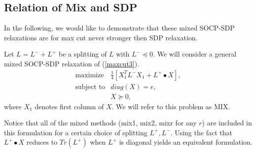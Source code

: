 \documentclass[12pt]{book}
\theoremstyle{definition}
\begin{document}



\subsection{Relation of Mix and SDP}

In the following, we would like to demonstrate that these mixed SOCP-SDP relaxations are for max cut never stronger then SDP relaxation. 

Let $L = L^- + L^+$ be a splitting of $L$ with $L^-\preceq 0.$
We will consider a general mixed SOCP-SDP relaxation of (\ref{maxcut3}).
\begin{equation}
\label{MaxCutMixedRelaxGeneral}
\begin{array}{ll}
\mbox{maximize} & \frac{1}{4}\left[ X_1^TL^-X_1 + L^+\bullet X \right], \\
\mbox{subject to} &  diag(X) = e, \\
			& X\succeq 0,
\end{array}
\end{equation}
where $X_1$ denotes first column of $X$. We will refer to this problem as MIX.

\rem Notice that all of the mixed methods (mix1, mix2, mixr for any $r$) are included in this formulation for a certain choice of splitting $L^+, L^-$. Using the fact that $L^+\bullet X$ reduces to $Tr(L^+)$ when $L^+$ is diagonal yields an equivalent formulation.
\end{document}
